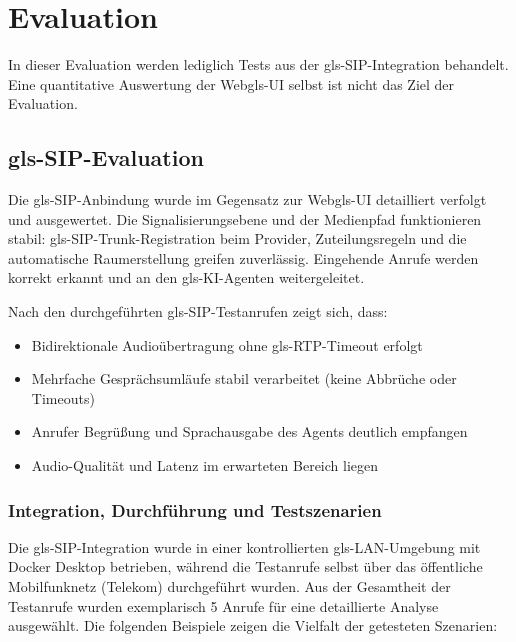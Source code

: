 \chapter{Evaluation}
\label{chap:evaluation}

In dieser Evaluation werden lediglich Tests aus der \gls{gls-SIP}-Integration behandelt. Eine quantitative Auswertung der Web\gls{gls-UI} selbst ist nicht das Ziel der Evaluation.

\section[SIP-Evaluation]{\gls{gls-SIP}-Evaluation}
Die \gls{gls-SIP}-Anbindung wurde im Gegensatz zur Web\gls{gls-UI} detailliert verfolgt und ausgewertet. Die Signalisierungsebene und der Medienpfad funktionieren stabil: \gls{gls-SIP}-Trunk-Registration beim Provider, Zuteilungsregeln und die automatische Raumerstellung greifen zuverlässig. Eingehende Anrufe werden korrekt erkannt und an den \gls{gls-KI}-Agenten weitergeleitet.

Nach den durchgeführten \gls{gls-SIP}-Testanrufen zeigt sich, dass:

\begin{itemize}
  \item Bidirektionale Audioübertragung ohne \gls{gls-RTP}-Timeout erfolgt
  \item Mehrfache Gesprächsumläufe stabil verarbeitet (keine Abbrüche oder Timeouts)
  \item Anrufer Begrü\ss ung und Sprachausgabe des Agents deutlich empfangen
  \item Audio-Qualität und Latenz im erwarteten Bereich liegen
\end{itemize}

\subsection{Integration, Durchführung und Testszenarien}

Die \gls{gls-SIP}-Integration wurde in einer kontrollierten \gls{gls-LAN}-Umgebung mit Docker Desktop betrieben, während die Testanrufe selbst über das öffentliche Mobilfunknetz (Telekom) durchgeführt wurden. Aus der Gesamtheit der Testanrufe wurden exemplarisch 5 Anrufe für eine detaillierte Analyse ausgewählt. Die folgenden Beispiele zeigen die Vielfalt der getesteten Szenarien:

